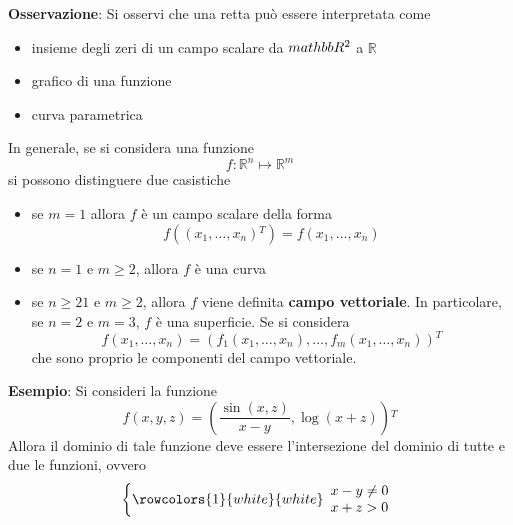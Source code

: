 \documentclass[a4paper]{extarticle}
\begin{document}
\vspace{1em}
\noindent
\textbf{Osservazione}: Si osservi che una retta può essere interpretata come
\begin{itemize}
    \item insieme degli zeri di un campo scalare da $\\mathbb{R}^2$ a $\mathbb{R}$
    \item grafico di una funzione
    \item curva parametrica
\end{itemize}
In generale, se si considera una funzione
\[f : \mathbb{R}^n \longmapsto \mathbb{R}^m\]
si possono distinguere due casistiche
\begin{itemize}
    \item se $m=1$ allora $f$ è un campo scalare della forma
    \[f \left((x_1,\dots,x_n){^T}\right) = f(x_1,\dots,x_n)\]
    
    \item se $n=1$ e $m\geq 2$, allora $f$ è una curva
    \item se $n\geq 21$ e $m\geq 2$, allora $f$ viene definita \textbf{campo vettoriale}. In particolare, se $n=2$ e $m=3$, $f$ è una superficie. Se si considera
    \[f(x_1,\dots,x_n) = \left(f_1(x_1,\dots,x_n),\dots,f_m(x_1,\dots,x_n) \right){^T}\]
    che sono proprio le componenti del campo vettoriale.
\end{itemize}

\vspace{1em}
\noindent
\textbf{Esempio}: Si consideri la funzione
\[f(x,y,z) = \left(\frac{\sin(x,z)}{x-y}, \log(x+z)\right){^T}\]
Allora il dominio di tale funzione deve essere l'intersezione del dominio di tutte e due le funzioni, ovvero
\[
    \left\{
    \rowcolors{1}{white}{white}
    \begin{array}{l}
        x-y \neq 0\\
        x+z > 0
    \end{array}
    \right.
\]

\vspace{1em}
\noindent
\end{document}
